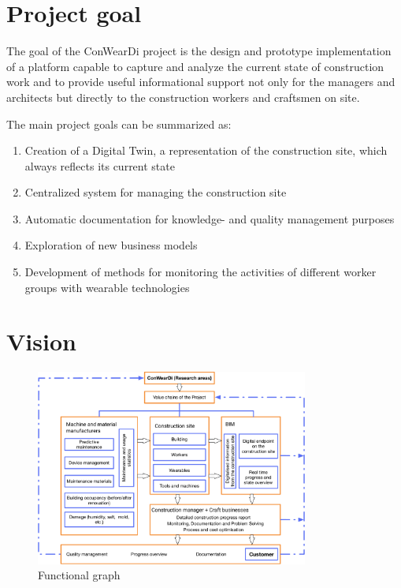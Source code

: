 \section{Project goal}
The goal of the ConWearDi project is the design and prototype implementation of a platform capable to capture and analyze the current state of construction work and to provide useful informational support not only for the managers and architects but directly to the construction workers and craftsmen on site. 


The main project goals can be summarized as:
\begin{enumerate}
  \item Creation of a Digital Twin, a representation of the construction site, which always reflects its current state 
  \item Centralized system for managing the construction site
  \item Automatic documentation for knowledge- and quality management purposes
  \item Exploration of new business models
  \item Development of methods for monitoring the activities of different worker groups with wearable technologies
\end{enumerate}

\section{Vision}

\begin{figure}[htp]
\includegraphics[width=0.8\textwidth]{figures/conweardi-functional}
\caption{Functional graph}
\label{fig:functional}
\end{figure}



